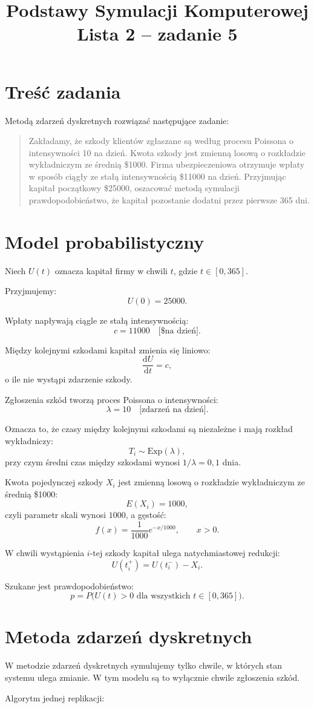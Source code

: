 \documentclass[12pt,a4paper]{article}
\title{Podstawy Symulacji Komputerowej\\Lista 2 -- zadanie 5}
\author{}
\date{}
\newcommand{\sekcjazwstep}[2]{%
  \Needspace{10\baselineskip}%
  \section*{#1}%
  \nopagebreak[4]%
  #2%
}
\begin{document}
\maketitle

\sekcjazwstep{Treść zadania}{%
Metodą zdarzeń dyskretnych rozwiązać następujące zadanie:
}

\begin{quote}
Zakładamy, że szkody klientów zgłaszane są według procesu Poissona
o intensywności 10 na dzień. Kwota szkody jest zmienną losową o rozkładzie
wykładniczym ze średnią \$1000. Firma ubezpieczeniowa otrzymuje wpłaty
w sposób ciągły ze stałą intensywnością \$11000 na dzień. Przyjmując kapitał
początkowy \$25000, oszacować metodą symulacji prawdopodobieństwo, że kapitał
pozostanie dodatni przez pierwsze 365 dni.
\end{quote}

\sekcjazwstep{Model probabilistyczny}{%
Niech $U(t)$ oznacza kapitał firmy w chwili $t$, gdzie $t\in[0,365]$.
}
Przyjmujemy:
\[
U(0)=25000.
\]

Wpłaty napływają ciągle ze stałą intensywnością:
\[
c=11000 \quad \text{[\$ na dzień]}.
\]

Między kolejnymi szkodami kapitał zmienia się liniowo:
\[
\frac{\mathrm{d}U}{\mathrm{d}t}=c,
\]
o ile nie wystąpi zdarzenie szkody.

Zgłoszenia szkód tworzą proces Poissona o intensywności:
\[
\lambda=10 \quad \text{[zdarzeń na dzień]}.
\]

Oznacza to, że czasy między kolejnymi szkodami są niezależne i mają rozkład
wykładniczy:
\[
T_i \sim \mathrm{Exp}(\lambda),
\]
przy czym średni czas między szkodami wynosi $1/\lambda=0{,}1$ dnia.

Kwota pojedynczej szkody $X_i$ jest zmienną losową o rozkładzie wykładniczym
ze średnią \$1000:
\[
E(X_i)=1000,
\]
czyli parametr skali wynosi $1000$, a gęstość:
\[
f(x)=\frac{1}{1000}e^{-x/1000},\qquad x>0.
\]

W chwili wystąpienia $i$-tej szkody kapitał ulega natychmiastowej redukcji:
\[
U(t_i^+)=U(t_i^-)-X_i.
\]

Szukane jest prawdopodobieństwo:
\[
p=P\big(U(t)>0 \text{ dla wszystkich } t\in[0,365]\big).
\]

\sekcjazwstep{Metoda zdarzeń dyskretnych}{%
W metodzie zdarzeń dyskretnych symulujemy tylko chwile, w których stan systemu
ulega zmianie. W tym modelu są to wyłącznie chwile zgłoszenia szkód.

Algorytm jednej replikacji:
}
\end{document}
